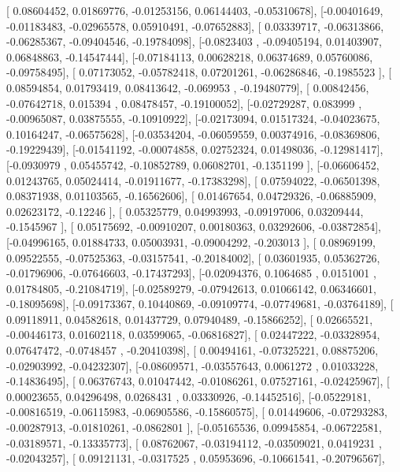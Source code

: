 \documentclass{article}
\begin{document}
       [ 0.08604452,  0.01869776, -0.01253156,  0.06144403, -0.05310678],
       [-0.00401649, -0.01183483, -0.02965578,  0.05910491, -0.07652883],
       [ 0.03339717, -0.06313866, -0.06285367, -0.09404546, -0.19784098],
       [-0.0823403 , -0.09405194,  0.01403907,  0.06848863, -0.14547444],
       [-0.07184113,  0.00628218,  0.06374689,  0.05760086, -0.09758495],
       [ 0.07173052, -0.05782418,  0.07201261, -0.06286846, -0.1985523 ],
       [ 0.08594854,  0.01793419,  0.08413642, -0.069953  , -0.19480779],
       [ 0.00842456, -0.07642718,  0.015394  ,  0.08478457, -0.19100052],
       [-0.02729287,  0.083999  , -0.00965087,  0.03875555, -0.10910922],
       [-0.02173094,  0.01517324, -0.04023675,  0.10164247, -0.06575628],
       [-0.03534204, -0.06059559,  0.00374916, -0.08369806, -0.19229439],
       [-0.01541192, -0.00074858,  0.02752324,  0.01498036, -0.12981417],
       [-0.0930979 ,  0.05455742, -0.10852789,  0.06082701, -0.1351199 ],
       [-0.06606452,  0.01243765,  0.05024414, -0.01911677, -0.17383298],
       [ 0.07594022, -0.06501398,  0.08371938,  0.01103565, -0.16562606],
       [ 0.01467654,  0.04729326, -0.06885909,  0.02623172, -0.12246   ],
       [ 0.05325779,  0.04993993, -0.09197006,  0.03209444, -0.1545967 ],
       [ 0.05175692, -0.00910207,  0.00180363,  0.03292606, -0.03872854],
       [-0.04996165,  0.01884733,  0.05003931, -0.09004292, -0.203013  ],
       [ 0.08969199,  0.09522555, -0.07525363, -0.03157541, -0.20184002],
       [ 0.03601935,  0.05362726, -0.01796906, -0.07646603, -0.17437293],
       [-0.02094376,  0.1064685 ,  0.0151001 ,  0.01784805, -0.21084719],
       [-0.02589279, -0.07942613,  0.01066142,  0.06346601, -0.18095698],
       [-0.09173367,  0.10440869, -0.09109774, -0.07749681, -0.03764189],
       [ 0.09118911,  0.04582618,  0.01437729,  0.07940489, -0.15866252],
       [ 0.02665521, -0.00446173,  0.01602118,  0.03599065, -0.06816827],
       [ 0.02447222, -0.03328954,  0.07647472, -0.0748457 , -0.20410398],
       [ 0.00494161, -0.07325221,  0.08875206, -0.02903992, -0.04232307],
       [-0.08609571, -0.03557643,  0.0061272 ,  0.01033228, -0.14836495],
       [ 0.06376743,  0.01047442, -0.01086261,  0.07527161, -0.02425967],
       [ 0.00023655,  0.04296498,  0.0268431 ,  0.03330926, -0.14452516],
       [-0.05229181, -0.00816519, -0.06115983, -0.06905586, -0.15860575],
       [ 0.01449606, -0.07293283, -0.00287913, -0.01810261, -0.0862801 ],
       [-0.05165536,  0.09945854, -0.06722581, -0.03189571, -0.13335773],
       [ 0.08762067, -0.03194112, -0.03509021,  0.0419231 , -0.02043257],
       [ 0.09121131, -0.0317525 ,  0.05953696, -0.10661541, -0.20796567],
\end{document}

